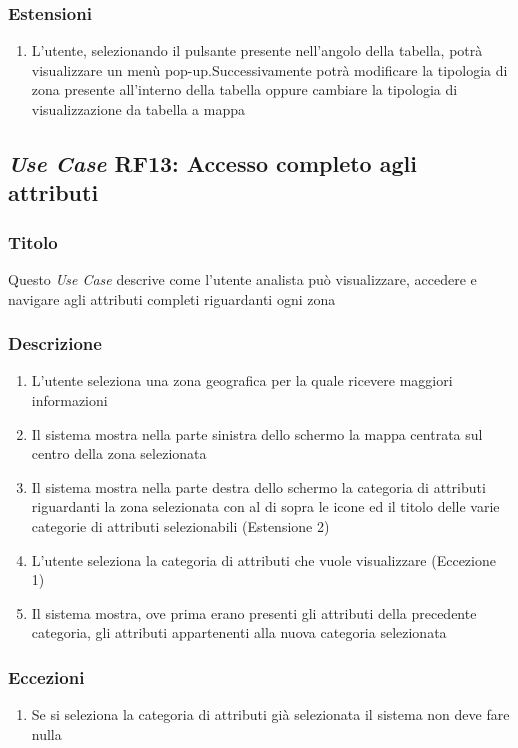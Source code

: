         \subsubsection{Estensioni}
            \begin{enumerate}
                \item L'utente, selezionando il pulsante presente nell'angolo della tabella, potrà visualizzare un menù pop-up.Successivamente potrà modificare la tipologia di zona presente all'interno della tabella oppure cambiare la tipologia di visualizzazione da tabella a mappa
            \end{enumerate}

    \subsection{\textit{Use Case} RF13: Accesso completo agli attributi}
        \subsubsection{Titolo}
            Questo \textit{Use Case} descrive come l'utente analista può visualizzare, accedere e navigare agli attributi completi riguardanti ogni zona
        \subsubsection{Descrizione}
            \begin{enumerate}
                \item L'utente seleziona una zona geografica per la quale ricevere maggiori informazioni
                \item Il sistema mostra nella parte sinistra dello schermo la mappa centrata sul centro della zona selezionata
                \item Il sistema mostra nella parte destra dello schermo la categoria di attributi riguardanti la zona selezionata con al di sopra le icone ed il titolo delle varie categorie di attributi selezionabili (Estensione 2)
                \item L'utente seleziona la categoria di attributi che vuole visualizzare (Eccezione 1)
                \item Il sistema mostra, ove prima erano presenti gli attributi della precedente categoria, gli attributi appartenenti alla nuova categoria selezionata
            \end{enumerate}
        \subsubsection{Eccezioni}
            \begin{enumerate}
                \item Se si seleziona la categoria di attributi già selezionata il sistema non deve fare nulla
            \end{enumerate}
